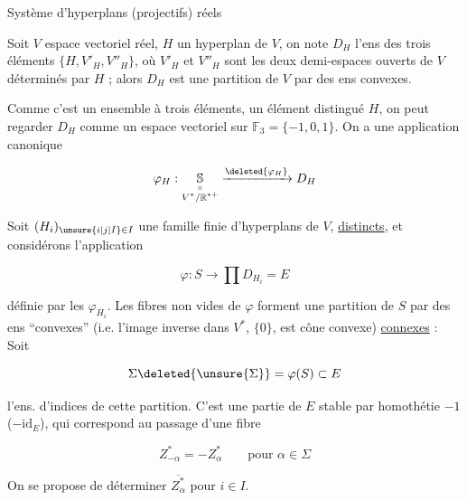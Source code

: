 
Système d'hyperplans (projectifs) réels


Soit $V$ espace vectoriel réel, $H$ un hyperplan de $V$, on note $D_H$  l'ens des trois éléments  $\{H,V'_H,V''_H\}$, où $V'_H$ et $V''_H$ sont les deux demi-espaces ouverts de $V$ déterminés par $H$ ;  alors  $D_H$ est une partition de $V$ par des ens convexes.

Comme c'est un ensemble à trois éléments, un élément distingué \deleted{$\{$}$H$\deleted{$\}$}, on peut regarder $D_H$ comme un espace vectoriel sur $\mathbb F_3=\{-1,0,1\}$. On a une application canonique


\[
\varphi_H:\underset{\substack{\shortparallel\\ V^*/\mathbb R^{*+}}}{\mathbb S}\xrightarrow{\deleted{\varphi_H}}D_H
\]

Soit $(H_i)_{\unsure{i|j|I}\in I}$ une famille finie d'hyperplans de $V$, \uline{distincts}, et considérons l'application


\[
\varphi:S\longrightarrow\prod D_{H_i}=E
\]

définie par les $\varphi_{H_i}$. Les fibres non vides de $\varphi$ forment une partition de $S$ par des  ens ``convexes'' (i.e. l'image inverse dans $V^*$,  $\{0\}$, est   cône convexe) \uline{} \uline{connexes} :  Soit


\[
\Sigma\deleted{\unsure{\Sigma}}=\varphi(S)\subset E
\]

l'ens. d'indices de cette partition. C'est une partie de $E$ stable par  homothétie $-1$ ($-\mathrm{id}_E$), qui correspond au passage  d'une fibre

\[
Z^*_{-\alpha}=-Z^*_\alpha\qquad\text{pour }\alpha\in\Sigma
\]

On se propose de déterminer $\overline{Z^*_\alpha}$ pour $i\in I$.
